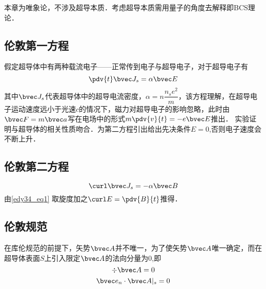 

本章为唯象论，不涉及超导本质．考虑超导本质需用量子的角度去解释即BCS理论．
\subsection{伦敦第一方程}
假定超导体中有两种载流电子——正常传到电子与超导电子，对于超导电子有
\begin{equation}
\pdv{t}\bvec J_s=\alpha\bvec E \label{edy34_eq1}
\end{equation}
其中$\bvec J_s$代表超导体中的超导电流密度，$\alpha=n\dfrac {n_se^2}m$，该方程理解，在超导电子运动速度远小于光速$c$的情况下，磁力对超导电子的影响忽略，此时由$\bvec F=m \bvec a$写在电场中的形式$m\pdv{v}{t}=-e\bvec E$推出．
实验证明与超导体的相关性质吻合．为第二方程引出给出先决条件$E=0$,否则电子速度会不断上升．
\subsection{伦敦第二方程}
\begin{equation}
\curl\bvec J_s=-\alpha\bvec B \label{edy34_eq2}
\end{equation}
由\autoref{edy34_eq1} 取旋度加之$\curl E=\pdv{B}{t}$推得．
\subsection{伦敦规范}
在库伦规范的前提下，矢势$\bvec A$并不唯一，为了使矢势$\bvec A$唯一确定，而在超导体表面$S$上引入限定$\bvec A$的法向分量为$0$,即
\begin{equation}
\div \bvec A=0
\end{equation}
\begin{equation}
\bvec e_n \cdot \bvec A|_s=0
\end{equation}
